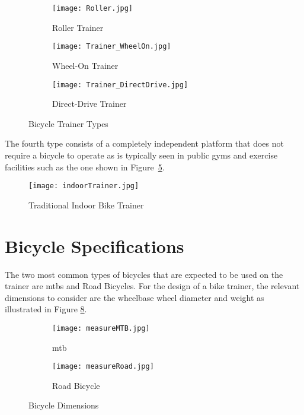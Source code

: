 \begin{figure}[H]
	\centering
	\begin{subfigure}{.3\textwidth}
		\centering
		\texttt{[image: Roller.jpg]}
		\caption{Roller Trainer}
		\label{fig:roller}
	\end{subfigure}
	\hfill
	\begin{subfigure}{.3\textwidth}
		\centering
		\texttt{[image: Trainer\_WheelOn.jpg]}
		\caption{Wheel-On Trainer}
		\label{fig:wheelon}
	\end{subfigure}
	\hfill
	\begin{subfigure}{.3\textwidth}
		\centering
		\texttt{[image: Trainer\_DirectDrive.jpg]}
		\caption{Direct-Drive Trainer}
		\label{fig:directdrive}
	\end{subfigure}
	\caption{Bicycle Trainer Types}
	\label{fig:trainers}
	\citep[2022]{Zwift:2022}
\end{figure}

\vspace*{-0.5cm}

The fourth type consists of a completely independent platform that does not require a bicycle to operate as is typically seen in public gyms and exercise facilities such as the one shown in Figure~\ref{fig:bike}.

\begin{figure}[H]
	\centering
	\texttt{[image: indoorTrainer.jpg]}
	\caption{Traditional Indoor Bike Trainer}
	\label{fig:bike}
	\citep[2022]{Alibaba:2022}
\end{figure}

\vspace*{-0.5cm}

\section{Bicycle Specifications}
\label{sec:specs}

The two most common types of bicycles that are expected to be used on the trainer are \acp{mtb} and Road Bicycles. For the design of a bike trainer, the relevant dimensions to consider are the wheelbase wheel diameter and weight as illustrated in Figure \ref{fig:bikeDim}.

\begin{figure}[H]
	\centering
	\begin{subfigure}{.5\textwidth}
		\centering
		\texttt{[image: measureMTB.jpg]}
		\caption{\ac{mtb} \citep{Pratama:2021}}
		\label{fig:sub1}
	\end{subfigure}%
	\begin{subfigure}{.5\textwidth}
		\centering
		\texttt{[image: measureRoad.jpg]}
		\caption{Road Bicycle \citep{Morozev:2017}}
		\label{fig:sub2}
	\end{subfigure}
	\caption{Bicycle Dimensions}
	\label{fig:bikeDim}
\end{figure}

